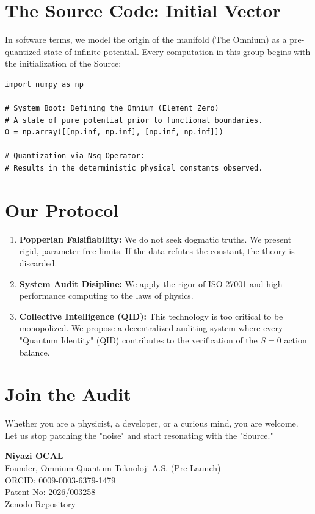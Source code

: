 \documentclass[11pt,a4paper]{article}
\begin{document}
\section*{The Source Code: Initial Vector}
In software terms, we model the origin of the manifold (The Omnium) as a pre-quantized state of infinite potential. Every computation in this group begins with the initialization of the Source:

\begin{lstlisting}
import numpy as np

# System Boot: Defining the Omnium (Element Zero)
# A state of pure potential prior to functional boundaries.
O = np.array([[np.inf, np.inf], [np.inf, np.inf]])

# Quantization via Nsq Operator:
# Results in the deterministic physical constants observed.
\end{lstlisting}

\section*{Our Protocol}
\begin{enumerate}
    \item \textbf{Popperian Falsifiability:} We do not seek dogmatic truths. We present rigid, parameter-free limits. If the data refutes the constant, the theory is discarded.
    \item \textbf{System Audit Disipline:} We apply the rigor of ISO 27001 and high-performance computing to the laws of physics.
    \item \textbf{Collective Intelligence (QID):} This technology is too critical to be monopolized. We propose a decentralized auditing system where every "Quantum Identity" (QID) contributes to the verification of the $S=0$ action balance.
\end{enumerate}

\vspace{0.5cm}

\section*{Join the Audit}
Whether you are a physicist, a developer, or a curious mind, you are welcome. Let us stop patching the "noise" and start resonating with the "Source."

\vspace{1cm}

\begin{flushleft}
    \textbf{Niyazi OCAL} \\
    Founder, Omnium Quantum Teknoloji A.S. (Pre-Launch) \\
    ORCID: 0009-0003-6379-1479 \\
    Patent No: 2026/003258 \\
    \href{https://doi.org/10.5281/zenodo.19062149}{Zenodo Repository}
\end{flushleft}
\end{document}
